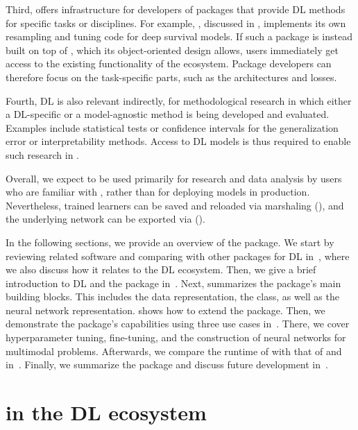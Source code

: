 \documentclass[article,shortnames]{jss}
\theoremstyle{definition}
\begin{document}
Third, \mlrttorch{} offers infrastructure for developers of packages that provide DL methods for specific tasks or disciplines.
For example,  \citep{ref-elbadisy2026survdnn}, discussed in , implements its own resampling and tuning code for deep survival models.
If such a package is instead built on top of \mlrttorch{}, which its object-oriented design allows, users immediately get access to the existing functionality of the \mlrt{} ecosystem.
Package developers can therefore focus on the task-specific parts, such as the architectures and losses.

Fourth, DL is also relevant indirectly, for methodological research in which either a DL-specific or a model-agnostic method is being developed and evaluated.
Examples include statistical tests or confidence intervals for the generalization error or interpretability methods.
Access to DL models is thus required to enable such research in \rlang{}.

Overall, we expect \mlrttorch{} to be used primarily for research and data analysis by users who are familiar with \rlang{}, rather than for deploying models in production.
Nevertheless, trained learners can be saved and reloaded via marshaling (), and the underlying \torch{} network can be exported via  ().

In the following sections, we provide an overview of the package. We start by reviewing related software and comparing \mlrttorch{} with other \rlang{} packages for DL in~, where we also discuss how it relates to the \pytorch{} DL ecosystem.
Then, we give a brief introduction to DL and the  package in~.
Next,  summarizes the package's main building blocks. This includes the data representation, the  class, as well as the neural network  representation.
 shows how to extend the package. Then, we demonstrate the package's capabilities using three use cases in~.
There, we cover hyperparameter tuning, fine-tuning, and the construction of neural networks for multimodal problems.
Afterwards, we compare the runtime of \mlrttorch{} with that of \torch{} and \pytorch{} in~.
Finally, we summarize the package and discuss future development in~.

\section[mlr3torch in the DL ecosystem]{\mlrttorch{} in the DL ecosystem}\label{sec:comparison}
\end{document}
